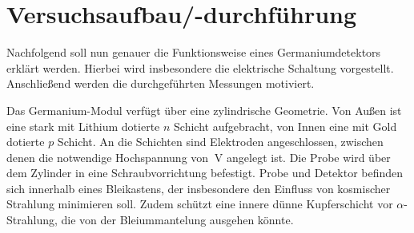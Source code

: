 \section{Versuchsaufbau/-durchführung}
Nachfolgend soll nun genauer die Funktionsweise eines Germaniumdetektors erklärt werden. Hierbei wird insbesondere 
die elektrische Schaltung vorgestellt. Anschließend werden die durchgeführten Messungen motiviert.

Das Germanium-Modul verfügt über eine zylindrische Geometrie. Von Außen ist eine stark mit Lithium dotierte $n$
Schicht aufgebracht, von Innen eine mit Gold dotierte $p$ Schicht. An die Schichten sind Elektroden angeschlossen, zwischen denen 
die notwendige Hochspannung von $\SI{}{\volt}$ angelegt ist. Die Probe wird über dem Zylinder in eine Schraubvorrichtung 
befestigt. Probe und Detektor befinden sich innerhalb eines Bleikastens, der insbesondere den Einfluss von kosmischer 
Strahlung minimieren soll. Zudem schützt eine innere dünne Kupferschicht vor $\alpha$-Strahlung, die von der Bleiummantelung ausgehen 
könnte. 

